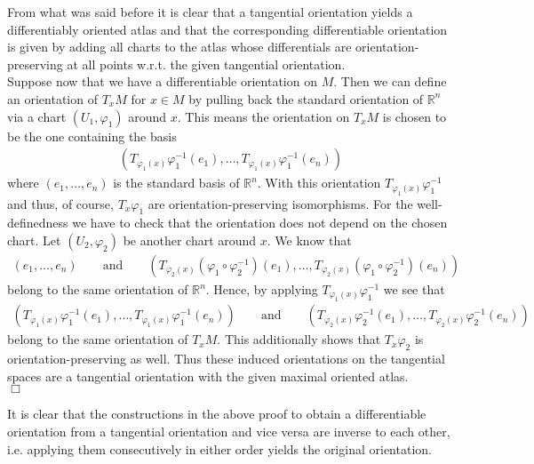 \begin{prf}
From what was said before it is clear that a tangential orientation yields a differentiably oriented atlas and that the corresponding differentiable orientation is given by adding all charts to the atlas whose differentials are orientation-preserving at all points w.r.t. the given tangential orientation.
\\
Suppose now that we have a differentiable orientation on $M$. Then we can define an orientation of $T_{x}M$ for $x \in M$ by pulling back the standard orientation of $\mathbb{R}^{n}$ via a chart $(U_{1},\varphi_{1})$ around $x$. This means the orientation on $T_{x}M$ is chosen to be the one containing the basis
\begin{align*}
  \left(
    T_{\varphi_{1}(x)}
    \varphi_{1}^{-1}(e_{1})
    ,
    \ldots
    ,
    T_{\varphi_{1}(x)}
    \varphi_{1}^{-1}(e_{n})
  \right)
\end{align*}
where $(e_{1},\ldots,e_{n})$ is the standard basis of $\mathbb{R}^{n}$. With this orientation $T_{\varphi_{1}(x)}\varphi_{1}^{-1}$ and thus, of course, $T_{x}\varphi_{1}$ are orientation-preserving isomorphisms. For the well-definedness we have to check that the orientation does not depend on the chosen chart. Let $(U_{2},\varphi_{2})$ be another chart around $x$. We know that
\begin{align*}
  (e_{1},\ldots,e_{n})
  \qquad
  \text{and}
  \qquad
  \left(
    T_{\varphi_{2}(x)}(\varphi_{1} \circ \varphi_{2}^{-1})(e_{1})
    ,
    \ldots
    ,
    T_{\varphi_{2}(x)}(\varphi_{1} \circ \varphi_{2}^{-1})(e_{n})
  \right)
\end{align*}
belong to the same orientation of $\mathbb{R}^{n}$. Hence, by applying $T_{\varphi_{1}(x)}\varphi_{1}^{-1}$ we see that
\begin{align*}
  \left(
    T_{\varphi_{1}(x)}\varphi_{1}^{-1}(e_{1})
    ,
    \ldots
    ,
    T_{\varphi_{1}(x)}\varphi_{1}^{-1}(e_{n})
  \right)
  \qquad
  \text{and}
  \qquad
  \left(
    T_{\varphi_{2}(x)}\varphi_{2}^{-1}(e_{1})
    ,
    \ldots
    ,
    T_{\varphi_{2}(x)}\varphi_{2}^{-1}(e_{n})
  \right)
\end{align*}
belong to the same orientation of $T_{x}M$. This additionally shows that $T_{x}\varphi_{2}$ is orientation-preserving as well. Thus these induced orientations on the tangential spaces are a tangential orientation with the given maximal oriented atlas.
\\
\phantom{proven}
\hfill
$\Box$
\end{prf}
It is clear that the constructions in the above proof to obtain a differentiable orientation from a tangential orientation and vice versa are inverse to each other, i.e. applying them consecutively in either order yields the original orientation.
